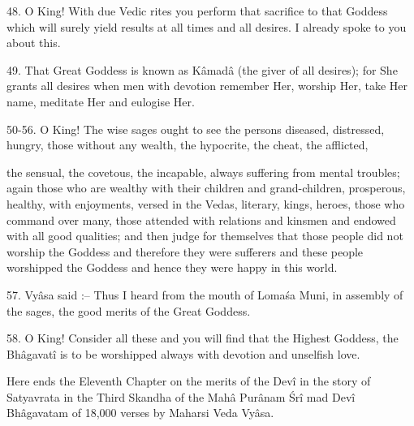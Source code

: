 48. O King! With due Vedic rites you perform that sacrifice to that Goddess which will surely yield results at all times and all desires. I already spoke to you about this.

49. That Great Goddess is known as K\^amad\^a (the giver of all desires); for She grants all desires when men with devotion remember Her, worship Her, take Her name, meditate Her and eulogise Her.

50-56. O King! The wise sages ought to see the persons diseased, distressed, hungry, those without any wealth, the hypocrite, the cheat, the afflicted,

the sensual, the covetous, the incapable, always suffering from mental troubles; again those who are wealthy with their children and grand-children, prosperous, healthy, with enjoyments, versed in the Vedas, literary, kings, heroes, those who command over many, those attended with relations and kinsmen and endowed with all good qualities; and then judge for themselves that those people did not worship the Goddess and therefore they were sufferers and these people worshipped the Goddess and hence they were happy in this world.

57. Vy\^asa said :-- Thus I heard from the mouth of Loma\'sa Muni, in assembly of the sages, the good merits of the Great Goddess.

58. O King! Consider all these and you will find that the Highest Goddess, the Bh\^agavat\^i is to be worshipped always with devotion and unselfish love.

Here ends the Eleventh Chapter on the merits of the Dev\^i in the story of Satyavrata in the Third Skandha of the Mah\^a Pur\^anam \'Sr\^i mad Dev\^i Bh\^agavatam of 18,000 verses by Maharsi Veda Vy\^asa.